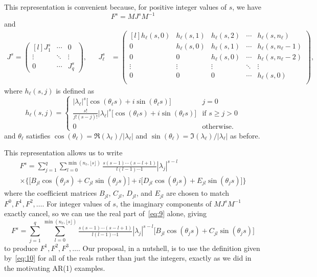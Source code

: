 \documentclass[12pt,fleqn]{article}
\begin{document}
This representation is convenient because, for positive integer values
of $s$, we have
\[
F^s = M J^s M^{-1}
\]
and
\begin{align*}
J^s =
\begin{pmatrix*}[l]
  J_1^s  & \cdots & 0      \\
  \vdots & \ddots & \vdots \\
  0      & \cdots & J_q^s
\end{pmatrix*}, &&
J_\ell^s &=
\begin{pmatrix*}[l]
  h_\ell(s,0) & h_\ell(s,1) & h_\ell(s,2) & \cdots & h_\ell(s,n_\ell)   \\
  0           & h_\ell(s,0) & h_\ell(s,1) & \cdots & h_\ell(s,n_\ell-1) \\
  0           & 0           & h_\ell(s,0) & \cdots & h_\ell(s,n_\ell-2) \\
  \vdots      & \vdots      & \vdots      & \ddots & \vdots             \\
  0           & 0           & 0           & \cdots & h_\ell(s,0)        \\
\end{pmatrix*},
\end{align*}
  where $h_\ell(s,j)$ is defined as
\begin{equation*}
h_\ell(s,j) =
\begin{cases}
  |\lambda_\ell|^s \big[\cos(\theta_\ell s) + i \sin(\theta_\ell s)\big] & j = 0 \\
  \frac{s!}{j!(s-j)!} |\lambda_\ell|^s \big[\cos(\theta_\ell s) + i \sin(\theta_\ell s)\big] & \text{if } s \geq j > 0 \\
  0 & \text{otherwise.}
\end{cases}
\end{equation*}
and $\theta_\ell$ satisfies
$\cos(\theta_\ell) = \Re(\lambda_\ell)/|\lambda_\ell|$ and
$\sin(\theta_\ell) = \Im(\lambda_\ell)/|\lambda_\ell|$ as before.

This representation allows us to write
\begin{multline}
  \label{eq:9}
  F^s =
  \sum_{j = 1}^q \sum_{l=0}^{\min(n_\ell, \lfloor s\rfloor)} \tfrac{s(s-1)\cdots(s-l+1)}{l (l - 1) \cdots 1} |\lambda_j|^{s-l} \\
  \times\Big\{\big[B_{jl} \cos(\theta_j s) + C_{jl} \sin(\theta_j s)\big] + i\big[D_{jl} \cos(\theta_j s) + E_{jl} \sin(\theta_j s)\big]\Big\}
\end{multline}
where the coefficient matrices $B_{jl}$, $C_{jl}$, $D_{jl}$, and
$E_{jl}$ are chosen to match $F^0, F^1, F^2,\dots$. For integer
values of $s$, the imaginary components of $M J^s M^{-1}$ exactly
cancel, so we can use the real part of~\eqref{eq:9} alone, giving
\begin{equation}
  \label{eq:10}
  F^s =
  \sum_{j = 1}^q \sum_{l=0}^{\min(n_\ell, \lfloor s \rfloor)} \tfrac{s(s-1)\cdots(s-l+1)}{l (l - 1) \cdots 1} |\lambda_j|^{s-l} \big[B_{jl} \cos(\theta_j s) + C_{jl} \sin(\theta_j s)\big]
\end{equation}
to produce $F^1, F^2, F^3,\dots$. Our proposal, in a nutshell, is to
use the definition given by~\eqref{eq:10} for all of the reals rather
than just the integers, exactly as we did in the motivating AR(1)
examples.
\end{document}
